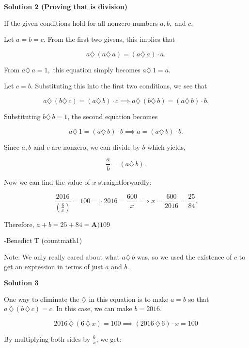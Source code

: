 \begin{enumerate}
 



\textbf{Solution 2 (Proving that  is division)}

If the given conditions hold for all nonzero numbers $a, b,$ and $c$, 

 Let $a=b=c.$ From the first two givens, this implies that 

 

 \[a\diamondsuit\, (a\diamondsuit\, {a})=(a\diamondsuit\, a)\cdot{a}.\]

 
From $a\diamondsuit\,{a}=1,$ this equation simply becomes $a\diamondsuit\,{1}=a.$

 
Let $c=b.$ Substituting this into the first two conditions, we see that 

 
 \[a\diamondsuit\, (b\diamondsuit\, {c})=(a\diamondsuit\, {b})\cdot{c} \implies a\diamondsuit\, (b\diamondsuit\, {b})=(a\diamondsuit\, {b})\cdot{b}.\]

 Substituting $b\diamondsuit\, {b} =1$, the second equation becomes

 
 \[a\diamondsuit\, {1}=(a\diamondsuit\, {b})\cdot{b} \implies a=(a\diamondsuit\,{b})\cdot{b}.\]

 Since $a, b$ and $c$ are nonzero, we can divide by $b$ which yields,

 
 \[\frac{a}{b}=(a\diamondsuit\, {b}).\]

 Now we can find the value of $x$ straightforwardly:

 
 \[\frac{2016}{(\frac{6}{x})}=100 \implies 2016=\frac{600}{x} \implies x=\frac{600}{2016} = \frac{25}{84}.\]

 Therefore, $a+b=25+84=\boxed{\textbf{A)} 109}$

 -Benedict T (countmath1)

 Note: We only really cared about what $a\diamondsuit\,{b}$ was, so we used the existence of $c$ to get an expression in terms of just $a$ and $b$.

 



\textbf{Solution 3}

One way to eliminate the $\diamondsuit$ in this equation is to make $a = b$ so that  $a\,\diamondsuit\, (b\,\diamondsuit \,c) = c$. In this case, we can make $b = 2016$.

 
 \[2016 \,\diamondsuit\, (6\,\diamondsuit\, x)=100\implies  (2016\, \diamondsuit\, 6) \cdot x = 100\]

 By multiplying both sides by $\frac{6}{x}$, we get:


\end{enumerate}
